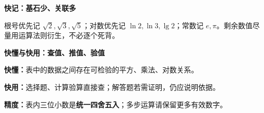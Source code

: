 \clearpage
\begin{summarybox}
\textbf{\textcolor{CSummary}{快记：基石少、关联多}}
\par\medskip
\begin{center}

\end{center}
\medskip
根号优先记 $\sqrt2,\sqrt3,\sqrt5$；对数优先记 $\ln2,\ln3,\lg2$；常数记 $e,\pi$。剩余数值尽量用运算法则衍生，不必逐个死背。
\end{summarybox}
\clearpage
\begin{summarybox}
\textbf{\textcolor{CSummary}{快懂与快用：查值、推值、验值}}
\par\medskip
\begin{center}

\end{center}
\medskip
\textbf{快懂：}表中的数据之间存在可检验的平方、乘法、对数关系。\par\textbf{快用：}选择题、计算验算直接查；解答题若需证明，仍应说明依据。\par\textbf{精度：}表内三位小数是\textbf{统一四舍五入}；多步运算请保留更多有效数字。
\end{summarybox}
